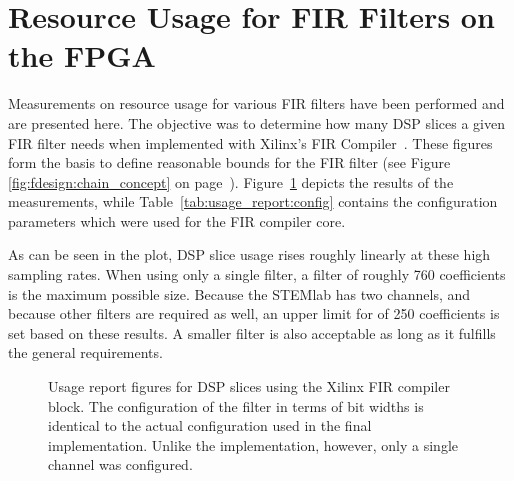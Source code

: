 \clearpage
%
%
\section{Resource Usage for FIR Filters on the FPGA} %
\label{sec:fir_filter_resouce_usage}

Measurements   on    resource   usage    for   various   FIR    filters   have
been   performed    and   are    presented   here. The   objective    was   to
determine   how   many   DSP   slices   a  given   FIR   filter   needs   when
implemented   with  Xilinx's   FIR  Compiler~\cite{xilinx:fir-compiler}. These
figures   form   the    basis   to   define   reasonable    bounds   for   the
FIR   filter     (see   Figure~   \ref{fig:fdesign:chain_concept}
on    page~\pageref{fig:fdesign:chain_concept}). Figure~\ref{fig:usage_report}
depicts      the       results      of      the       measurements,      while
Table~\ref{tab:usage_report:config}  contains   the  configuration  parameters
which were used for the FIR compiler core.

As can be  seen in the plot,  DSP slice usage rises roughly  linearly at these
high sampling  rates. When using  only a  single filter,  a filter  of roughly
\num{760} coefficients is  the maximum possible size. Because  the STEMlab has
two channels, and  because other filters are required as  well, an upper limit
for  of  \num{250} coefficients is set based  on these results. A
smaller  filter  is  also  acceptable  as long  as  it  fulfills  the  general
requirements.

\vfill
\begin{figure}[h]
    \centering
    
    \caption[Usage Report FIR Compiler]{%
        Usage  report figures  for DSP  slices using  the Xilinx  FIR compiler
        block. The  configuration  of  the  filter in  terms  of  bit  widths
        is  identical   to  the  actual   configuration  used  in   the  final
        implementation. Unlike  the  implementation,  however, only  a  single
        channel was configured.%
    }
    \label{fig:usage_report}
\end{figure}

